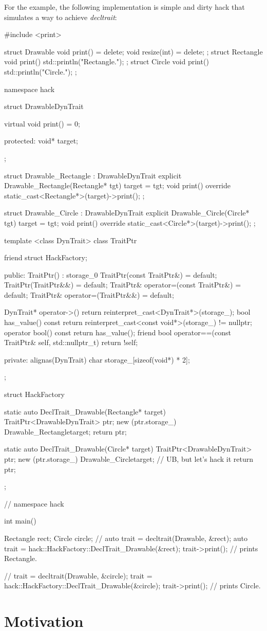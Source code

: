 \documentclass{article}
\begin{document}
For the example, the following implementation is simple and dirty hack that simulates a way to achieve \textit{decltrait}:
\begin{codeblock}
#include <print>

struct Drawable {
  void print() = delete;
  void resize(int) = delete;
};
struct Rectangle {
  void print() { std::println("Rectangle."); }
};
struct Circle {
  void print() { std::println("Circle."); }
};

namespace hack {

struct DrawableDynTrait {
  virtual void print() = 0;

 protected:
  void* target;
};

struct Drawable_Rectangle : DrawableDynTrait {
  explicit Drawable_Rectangle(Rectangle* tgt) { target = tgt; }
  void print() override { static_cast<Rectangle*>(target)->print(); }
};

struct Drawable_Circle : DrawableDynTrait {
  explicit Drawable_Circle(Circle* tgt) { target = tgt; }
  void print() override { static_cast<Circle*>(target)->print(); }
};

template <class DynTrait>
class TraitPtr {
  friend struct HackFactory;

 public:
  TraitPtr() : storage_{0} {}
  TraitPtr(const TraitPtr&) = default;
  TraitPtr(TraitPtr&&) = default;
  TraitPtr& operator=(const TraitPtr&) = default;
  TraitPtr& operator=(TraitPtr&&) = default;

  DynTrait* operator->()
  { return reinterpret_cast<DynTrait*>(storage_); }
  bool has_value() const {
    return reinterpret_cast<const void*>(storage_) != nullptr;
  }
  operator bool() const { return has_value(); }
  friend bool operator==(const TraitPtr& self, std::nullptr_t)
  { return !self; }

 private:
  alignas(DynTrait) char storage_[sizeof(void*) * 2];
};

struct HackFactory {
  static auto DeclTrait_Drawable(Rectangle* target) {
    TraitPtr<DrawableDynTrait> ptr;
    new (ptr.storage_) Drawable_Rectangle{target};
    return ptr;
  }

  static auto DeclTrait_Drawable(Circle* target) {
    TraitPtr<DrawableDynTrait> ptr;
    new (ptr.storage_) Drawable_Circle{target};  // UB, but let's hack it
    return ptr;
  }
};

}  // namespace hack

int main() {
  Rectangle rect;
  Circle circle;
  // auto trait = decltrait(Drawable, \&rect);
  auto trait = hack::HackFactory::DeclTrait_Drawable(&rect);
  trait->print();  // prints Rectangle.

  // trait = decltrait(Drawable, \&circle);
  trait = hack::HackFactory::DeclTrait_Drawable(&circle);
  trait->print();  // prints Circle.
}

\end{codeblock}

\section{Motivation}
\end{document}
